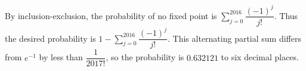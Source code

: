By inclusion-exclusion, the probability of no fixed point is $\sum_{j=0}^{2016}\dfrac{(-1)^j}{j!}$. Thus the desired probability is $\boxed{1-\sum_{j=0}^{2016}\dfrac{(-1)^j}{j!}}$. This alternating partial sum differs from $ e^{-1}$ by less than $\dfrac{1}{2017!}$, so the probability is $\boxed{0.632121}$ to six decimal places.
